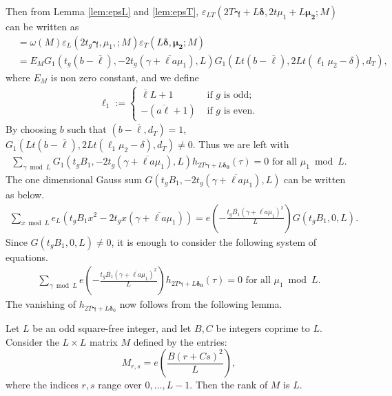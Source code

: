\documentclass[11pt]{amsart}
\numberwithin{equation}{section}
\begin{document}
Then from  Lemma \ref{lem:epsL} and \ref{lem:epsT},  $\varepsilon_{LT}(2T{\bm{ \gamma}}+L\bm\delta, 2t\mu_1+L\bm{\mu_2};  M)$ can be written as
\begin{align}
&= \omega(M)\varepsilon_L(2t_g\bm\gamma, \mu_1,; M)\varepsilon_T(L\bm\delta, \bm{\mu_2}; M)\\
&=  E_{M}G_1(t_g(b-\overline{\ell}), -2t_g(\gamma+\overline{\ell a}\mu_1), L)G_1(Lt(b-\overline{\ell}),2Lt (\ell_1\mu_2-\delta), d_T),
\end{align}
where $E_{M}$ is non zero constant, and we define
\begin{align}
    \ell_1:=\begin{cases}
        \overline{\ell}L+1& \text { if } g \text{ is odd};\\
        -(\overline{a\ell}+1) & \text { if } g \text{ is even}.
    \end{cases}
\end{align}
By choosing $b$ such that $(b-\overline{\ell}, d_T)=1$, $G_1(Lt(b-\overline{\ell}),2L t(\ell_1\mu_2-\delta), d_T)\neq 0$. Thus we are left with
\begin{align}
\sum_{\gamma\bmod L}G_1(t_gB_1, -2t_g(\gamma+\overline{\ell a}\mu_1), L) h_{2T\bm\gamma+L\bm{\delta_0}}(\tau)=0 \text{ for all } \mu_1\bmod L.    
\end{align}
The one dimensional Gauss sum $G(t_gB_1, -2t_g(\gamma+\overline{\ell a}\mu_1), L)$ can be written as below. 
\begin{align}
\sum_{x\bmod L}e_L(t_gB_1x^2-2t_gx(\gamma+\overline{\ell a}\mu_1))=e\left(-\frac{t_g\overline{B_1}(\gamma+\overline{\ell a}\mu_1)^2}{L}\right)G(t_gB_1, 0, L).
\end{align}
Since $G(t_gB_1, 0, L)\neq 0$, it is enough to consider the following system of equations.
\begin{align}\label{zerosqrclass-LEq}
\sum_{\gamma\bmod L}e\left(-\frac{t_g\overline{B_1}(\gamma+\overline{\ell a}\mu_1)^2}{L}\right) h_{2T{\bm{ \gamma}}+L\bm{\delta_0}}(\tau)=0 \text{ for all } \mu_1\bmod L.     
\end{align}
The vanishing of $h_{2T\bm\gamma+L\bm\delta_0}$ now follows from the following lemma.
\begin{lemma}
Let $L$ be an odd square-free integer, and let $B, C$ be integers coprime to $L$. Consider the $L \times L$ matrix $M$ defined by the entries:
\[
M_{r,s} = e\left( \frac{B(r+Cs)^2}{L} \right),
\]
where the indices $r, s$ range over $0, \dots, L-1$. Then the rank of $M$ is $L$.
\end{lemma}
\end{document}
